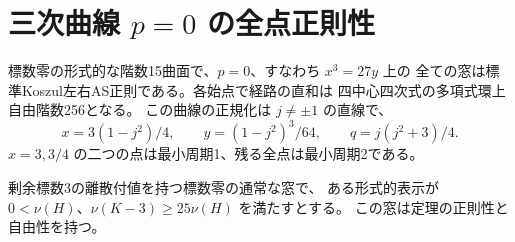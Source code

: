 \section{三次曲線 $p=0$ の全点正則性}
\label{sec:rank-fifteen-cubic-zero-disk}
\begin{theorem}\label{thm:rank-fifteen-cubic-zero-disk}
標数零の形式的な階数15曲面で、$p=0$、すなわち $x^3=27y$ 上の
全ての窓は標準Koszul左右AS正則である。各始点で経路の直和は
四中心四次式の多項式環上自由階数256となる。
この曲線の正規化は $j\ne\pm1$ の直線で、
\[
 x=3(1-j^2)/4,\qquad y=(1-j^2)^3/64,\qquad q=j(j^2+3)/4 .
\]
$x=3,3/4$ の二つの点は最小周期1、残る全点は最小周期2である。
\end{theorem}

\begin{lemma}\label{lem:rank-fifteen-cubic-zero-disk}
剰余標数3の離散付値を持つ標数零の通常な窓で、
ある形式的表示が $0<\nu(H)$、$\nu(K-3)\ge25\nu(H)$ を満たすとする。
この窓は定理の正則性と自由性を持つ。
\end{lemma}
